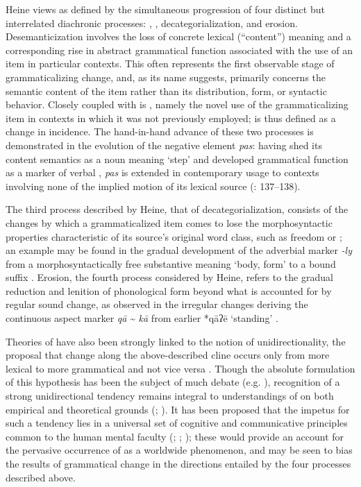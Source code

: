 \documentclass[output=paper]{langsci/langscibook}
\begin{document}
Heine views  as defined by the simultaneous progression of four distinct but interrelated diachronic processes: , , decategorialization, and erosion. Desemanticization involves the loss of concrete lexical (“content”) meaning and a corresponding rise in abstract grammatical function associated with the use of an item in particular contexts. This often represents the first observable stage of grammaticalizing change, and, as its name suggests, primarily concerns the semantic content of the item rather than its distribution, form, or syntactic behavior. Closely coupled with  is , namely the novel use of the grammaticalizing item in contexts in which it was not previously employed;  is thus defined as a change in incidence.  The hand-in-hand advance of these two processes is demonstrated in the evolution of the  negative element \textit{pas}: having shed its content semantics as a noun meaning ‘step’ and developed grammatical function as a marker of verbal , \textit{pas} is extended in contemporary usage to contexts involving none of the implied motion of its lexical source (\citealt{Hansen2009}: 137–138). 

The third process described by Heine, that of decategorialization, consists of the changes by which a grammaticalized item comes to lose the morphosyntactic properties characteristic of its source’s original word class, such as  freedom or  ; an example may be found in the gradual development of the  adverbial marker \textit{{}-ly} from a morphosyntactically free substantive meaning ‘body, form’ to a bound  suffix \citep[505]{Ramat2011}. Erosion, the fourth process considered by Heine, refers to the gradual reduction and lenition of phonological form beyond what is accounted for by regular sound change, as observed in the irregular changes deriving the  continuous aspect marker \textit{qā} {\textasciitilde} \textit{kā} from earlier *qāʔē ‘standing’ \citep[134]{Rubin2005}.

Theories of  have also been strongly linked to the notion of unidirectionality, the proposal that change along the above-described cline occurs only from more lexical to more grammatical and not vice versa \citep{Lehmann2015}.  Though the absolute formulation of this hypothesis has been the subject of much debate (e.g. \citealt{Norde2009}), recognition of a strong unidirectional tendency remains integral to understandings of  on both empirical and theoretical grounds (\citealt{Haspelmath1998}; \citealt{Heine2007}). It has been proposed that the impetus for such a tendency lies in a universal set of cognitive and communicative principles common to the human mental faculty (\citealt{Claudi1986}; \citealt{Bybee2003}; \citealt{Lehmann2015}); these would provide an account for the pervasive occurrence of  as a worldwide  phenomenon, and may be seen to bias the results of grammatical change in the directions entailed by the four processes described above.
\end{document}
